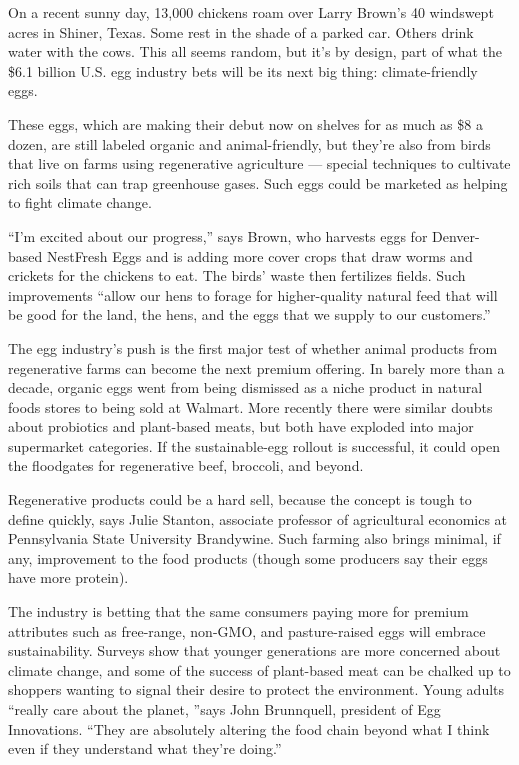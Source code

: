 On a recent sunny day, 13,000 chickens roam over Larry Brown's 40 windswept acres in Shiner, Texas. Some rest in the shade of a parked car. Others drink water with the cows. This all seems random, but it's by design, part of what the \$6.1 billion U.S. egg industry bets will be its next big thing: climate-friendly eggs.


These eggs, which are making their debut now on shelves for as much as \$8 a dozen, are still labeled organic and animal-friendly, but they're also from birds that live on farms using regenerative agriculture — special techniques to cultivate rich soils that can trap greenhouse gases. Such eggs could be marketed as helping to fight climate change.


``I'm excited about our progress,'' says Brown, who harvests eggs for Denver-based NestFresh Eggs and is adding more cover crops that draw worms and crickets for the chickens to eat. The birds' waste then fertilizes fields. Such improvements ``allow our hens to forage for higher-quality natural feed that will be good for the land, the hens, and the eggs that we supply to our customers.''


The egg industry's push is the first major test of whether animal products from regenerative farms can become the next premium offering. In barely more than a decade, organic eggs went from being dismissed as a niche product in natural foods stores to being sold at Walmart. More recently there were similar doubts about probiotics and plant-based meats, but both have exploded into major supermarket categories. If the sustainable-egg rollout is successful, it could open the floodgates for regenerative beef, broccoli, and beyond.


Regenerative products could be a hard sell, because the concept is tough to define quickly, says Julie Stanton, associate professor of agricultural economics at Pennsylvania State University Brandywine. Such farming also brings minimal, if any, improvement to the food products (though some producers say their eggs have more protein).


The industry is betting that the same consumers paying more for premium attributes such as free-range, non-GMO, and pasture-raised eggs will embrace sustainability. Surveys show that younger generations are more concerned about climate change, and some of the success of plant-based meat can be chalked up to shoppers wanting to signal their desire to protect the environment. Young adults ``really care about the planet, ''says John Brunnquell, president of Egg Innovations. ``They are absolutely altering the food chain beyond what I think even if they understand what they're doing.'' 
